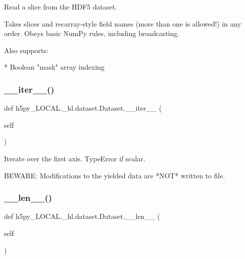 \begin{DoxyVerb}Read a slice from the HDF5 dataset.

Takes slices and recarray-style field names (more than one is
allowed!) in any order.  Obeys basic NumPy rules, including
broadcasting.

Also supports:

* Boolean "mask" array indexing
\end{DoxyVerb}
 \mbox{\label{classh5py__LOCAL_1_1__hl_1_1dataset_1_1Dataset_ad78768536bed7195da9b74025bac0435}} 
\subsubsection{\texorpdfstring{\+\_\+\+\_\+iter\+\_\+\+\_\+()}{\_\_iter\_\_()}}
{\footnotesize\ttfamily def h5py\+\_\+\+L\+O\+C\+A\+L.\+\_\+hl.\+dataset.\+Dataset.\+\_\+\+\_\+iter\+\_\+\+\_\+ (\begin{DoxyParamCaption}\item[{}]{self }\end{DoxyParamCaption})}

\begin{DoxyVerb}Iterate over the first axis.  TypeError if scalar.

BEWARE: Modifications to the yielded data are *NOT* written to file.
\end{DoxyVerb}
 \mbox{\label{classh5py__LOCAL_1_1__hl_1_1dataset_1_1Dataset_aafa9d582867bbe0d4f4387265cc7baf5}} 
\subsubsection{\texorpdfstring{\+\_\+\+\_\+len\+\_\+\+\_\+()}{\_\_len\_\_()}}
{\footnotesize\ttfamily def h5py\+\_\+\+L\+O\+C\+A\+L.\+\_\+hl.\+dataset.\+Dataset.\+\_\+\+\_\+len\+\_\+\+\_\+ (\begin{DoxyParamCaption}\item[{}]{self }\end{DoxyParamCaption})}

